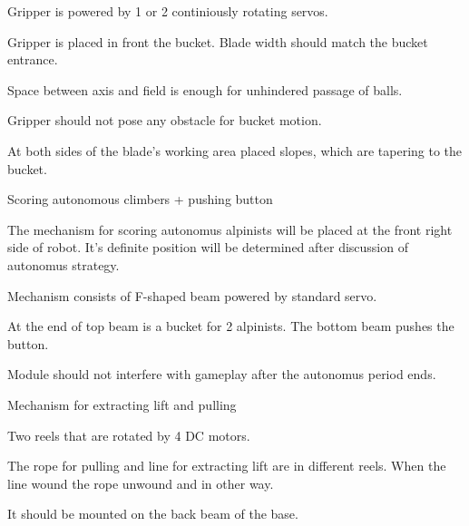 \begin{enumerate*}
\begin{enumerate*}
  		\item Gripper is powered by 1 or 2 continiously rotating servos.
  		
  		\item Gripper is placed in front the bucket. Blade width should match the bucket entrance.
  		
  		\item Space between axis and field is enough for unhindered passage of balls.
  		
  		\item Gripper should not pose any obstacle for bucket motion.
  		
  		\item At both sides of the blade's working area placed slopes, which are tapering to the bucket.
  	\end{enumerate*}
  	
  	\item Scoring autonomous climbers + pushing button
  	\begin{enumerate*}
  		\item The mechanism for scoring autonomus alpinists will be placed at the front right side of robot. It's definite position will be determined after discussion of autonomus strategy.
  		
  		\item Mechanism consists of F-shaped beam powered by standard servo.
  		
  		\item At the end of top beam is a bucket for 2 alpinists. The bottom beam pushes the button.
  		
  		\item Module should not interfere with gameplay after the autonomus period ends.
  	\end{enumerate*}
  	
  	\item Mechanism for extracting lift and pulling
  	
  	\begin{enumerate*}
  		\item Two reels that are rotated by 4 DC motors.
  		
  		\item The rope for pulling and line for extracting lift are in different reels. When the line wound the rope unwound and in other way.
  		
  		\item It should be mounted on the back beam of the base.
  		
  	\end{enumerate*}
  	
  \end{enumerate*}
  
